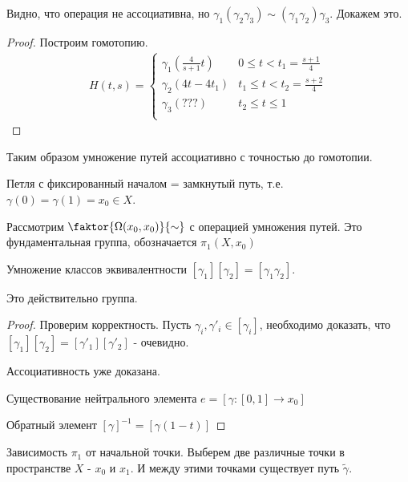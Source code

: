 Видно, что операция не ассоциативна, но $\gamma_1 (\gamma_2 \gamma_3) \sim (\gamma_1 \gamma_2) \gamma_3$. Докажем это.
\begin{proof}
    Построим гомотопию.
    \begin{align}
        H(t, s) = \begin{cases}
            \gamma_1(\frac{4}{s + 1} t) & 0   \leq t < t_1 = \frac{s + 1}{4} \\
            \gamma_2(4t - 4 t_1) & t_1 \leq t < t_2 = \frac{s + 2}{4} \\ 
            \gamma_3(???) & t_2 \leq t \leq 1 \\ 
        \end{cases}
    \end{align}
\end{proof}

Таким образом умножение путей ассоциативно с точностью до гомотопии.

\begin{definition}
    Петля с фиксированный началом = замкнутый путь, т.е. $\gamma(0) = \gamma(1) = x_0 \in X$.
\end{definition}

\begin{definition}
    Рассмотрим $\faktor{\Omega(x_0, x_0)}{\sim}$ с операцией умножения путей. Это фундаментальная группа, обозначается $\pi_1(X, x_0)$
\end{definition}

\begin{nota_bene}
    Умножение классов эквивалентности $[\gamma_1][\gamma_2] = [\gamma_1 \gamma_2]$.
\end{nota_bene}

\begin{theorem}
    Это действительно группа.
\end{theorem}

\begin{proof}
    Проверим корректность. Пусть $\gamma_i, \gamma'_i \in [\gamma_i]$, необходимо доказать, что $[\gamma_1][\gamma_2] = [\gamma'_1] [\gamma'_2]$ - очевидно.
    
    Ассоциативность уже доказана.

    Существование нейтрального элемента $e = [\gamma: [0,1] \rightarrow x_0]$

    Обратный элемент $[\gamma]^{-1} = [\gamma(1 - t)]$
\end{proof}

Зависимость $\pi_1$ от начальной точки. Выберем две различные точки в пространстве $X$ - $x_0$ и $x_1$. И между этими точками существует путь $\tilde{\gamma}$.


